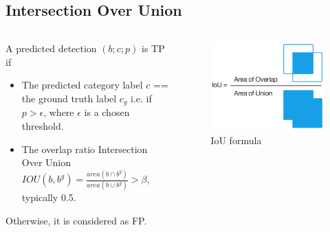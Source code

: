\documentclass{beamer}
\begin{document}
\subsection{Intersection Over Union}
\begin{frame}{}
	\begin{columns}
		\begin{column}{0.6\textwidth}
			A predicted detection $(b; c; p)$ is TP if
			\begin{itemize}
				\item The predicted category label $c$ == the ground truth label $c_g$ i.e. if $p > \epsilon$, where $\epsilon$ is a chosen threshold.
				\item The overlap ratio Intersection Over Union $IOU(b, b^g) = \frac{area(b \cap b^g)}{area(b \cup b^g)} > \beta$, typically 0.5.
			\end{itemize}
			Otherwise, it is considered as FP.
		\end{column}
		\begin{column}{0.4\textwidth}
			\begin{figure}
				\includegraphics[width=\textwidth]{images/IOU.PNG}
				\caption{IoU formula}
			\end{figure}
		\end{column}
	\end{columns}
\end{frame}


\end{document}
